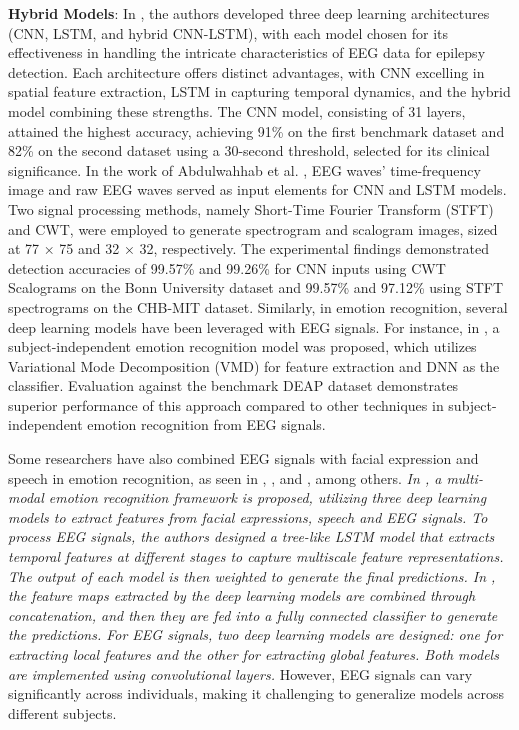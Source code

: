 \documentclass[preprint,12pt]{elsarticle}
\begin{document}
\textbf{Hybrid Models}: In \citep{hermawan_multi_2024}, the authors developed three deep learning architectures (CNN, LSTM, and hybrid CNN-LSTM), with each model chosen for its effectiveness in handling the intricate characteristics of EEG data for epilepsy detection. Each architecture offers distinct advantages, with CNN excelling in spatial feature extraction, LSTM in capturing temporal dynamics, and the hybrid model combining these strengths. The CNN model, consisting of 31 layers, attained the highest accuracy, achieving 91\% on the first benchmark dataset and 82\% on the second dataset using a 30-second threshold, selected for its clinical significance. In the work of Abdulwahhab et al. \citep{abdulwahhab_detection_2024}, EEG waves' time-frequency image and raw EEG waves served as input elements for CNN and LSTM models. Two signal processing methods, namely Short-Time Fourier Transform (STFT) and CWT, were employed to generate spectrogram and scalogram images, sized at 77 × 75 and 32 × 32, respectively. The experimental findings demonstrated detection accuracies of 99.57\% and 99.26\% for CNN inputs using CWT Scalograms on the Bonn University dataset and 99.57\% and 97.12\% using STFT spectrograms on the CHB-MIT dataset. Similarly, in emotion recognition, several deep learning models have been leveraged with EEG signals. For instance, in \citep{pandey_subject_2022},  a subject-independent emotion recognition model was proposed, which utilizes Variational Mode Decomposition (VMD) for feature extraction and DNN as the classifier. Evaluation against the benchmark DEAP dataset demonstrates superior performance of this approach compared to other techniques in subject-independent emotion recognition from EEG signals. 

Some researchers have also combined EEG signals with facial expression and speech in emotion recognition, as seen in \citep{hassouneh_development_2020}, \citep{pan_multimodal_2024}, and \citep{wang_multimodal_2023}, among others. \emph{In \citep{pan_multimodal_2024}, a multi-modal emotion recognition framework is proposed, utilizing three deep learning models to extract features from facial expressions, speech and EEG signals. To process EEG signals, the authors designed a tree-like LSTM model that extracts temporal features at different stages to capture multiscale feature representations. The output of each model is then weighted to generate the final predictions. In \citep{wang_multimodal_2023}, the feature maps extracted by the deep learning models are combined through concatenation, and then they are fed into a fully connected classifier to generate the predictions. For EEG signals, two deep learning models are designed: one for extracting local features and the other for extracting global features. Both models are implemented using convolutional layers.} However, EEG signals can vary significantly across individuals, making it challenging to generalize models across different subjects.
\end{document}

